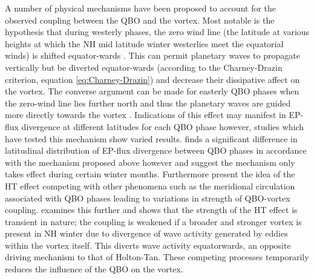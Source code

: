 A number of physical mechanisms have been proposed to account for the observed coupling between the QBO and the vortex. Most notable is the hypothesis that during westerly phases, the zero wind line (the latitude at various heights at which the NH mid latitude winter westerlies meet the equatorial winds) is shifted equator-wards \citep{HoltonJamesRTan1980}. This can permit planetary waves to propagate vertically but be diverted equator-wards (according to the Charney-Drazin criterion, equation \ref{eq:Charney-Drazin}) and decrease their dissipative affect on the vortex. The converse argument can be made for easterly QBO phases when the zero-wind line lies further north and thus the planetary waves are guided more directly towards the vortex \cite{Lu14}. Indications of this effect may manifest in EP-flux divergence at different latitudes for each QBO phase however, studies which have tested this mechanism show varied results. \cite{Hamilton} finds a significant difference in latitudinal distribution of EP-flux divergence between QBO phases in accordance with the mechanism proposed above however \cite{Hu2002} and \cite{Gray2004} suggest the mechanism only takes effect during certain winter months. Furthermore \citep{Garfinkel12} present the idea of the HT effect competing with other phenomena such as the meridional circulation associated with QBO phases leading to variations in strength of QBO-vortex coupling. \cite{Lu14} examines this further and shows that the strength of the HT effect is transient in nature; the coupling is weakened if a broader and stronger vortex is present in NH winter due to divergence of wave activity generated by eddies within the vortex itself. This diverts wave activity equatorwards, an opposite driving mechanism to that of Holton-Tan. These competing processes temporarily reduces the influence of the QBO on the vortex.

